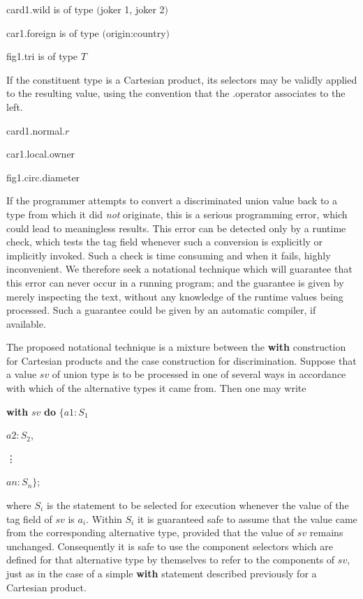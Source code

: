 card1.wild \tabto*{8em} is of type $($joker 1, joker 2$)$

car1.foreign \tabto*{8em} is of type $($origin:country$)$

fig1.tri \tabto*{8em} is of type $T$

\noindent
If the constituent type is a Cartesian product, its selectors may be validly applied to the resulting value, using the convention that the .operator associates to the left.

\quad card1.normal.$r$

\quad car1.local.owner

\quad fig1.circ.diameter

If the programmer attempts to convert a discriminated union value back to a type from which it did \textit{not} originate, this is a serious programming
error, which could lead to meaningless results. This error can be detected only by a runtime check, which tests the tag field whenever such a conversion is explicitly or implicitly invoked. Such a check is time consuming and when it fails, highly inconvenient. We therefore seek a notational technique which will guarantee that this error can never occur in a running program; and the guarantee is given by merely inspecting the text, without any knowledge of the runtime values being processed. Such a guarantee could be given by an automatic compiler, if available.

The proposed notational technique is a mixture between the \textbf{with} construction for Cartesian products and the case construction for discrimination. Suppose that a value $sv$ of union type is to be processed in one of several ways in accordance with which of the alternative types it came from. Then one may write

\quad \textbf{with} $sv$ \textbf{do} $\{a1:S_1$

\tabto*{7.6em}$a2:S_2$,
\smallskip

\tabto*{8.85em}\vdots

\tabto*{7.6em}$an:S_n\}$;

\noindent
where $S_i$ is the statement to be selected for execution whenever the value of the tag field of $sv$ is $a_i$. Within $S_i$ it is guaranteed safe to assume that the value came from the corresponding alternative type, provided that the value of $sv$ remains unchanged. Consequently it is safe to use the component selectors which are defined for that alternative type by themselves to refer to the components of $sv$, just as in the case of a simple \textbf{with} statement described previously for a Cartesian product.

